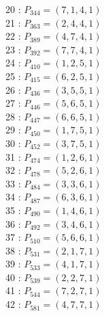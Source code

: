 \documentclass{article}
\begin{document}
{\begin{multicols}{2}
20 : $P_{344}=( 7, 1, 4, 1 )$\\
21 : $P_{363}=( 2, 4, 4, 1 )$\\
22 : $P_{389}=( 4, 7, 4, 1 )$\\
23 : $P_{392}=( 7, 7, 4, 1 )$\\
24 : $P_{410}=( 1, 2, 5, 1 )$\\
25 : $P_{415}=( 6, 2, 5, 1 )$\\
26 : $P_{436}=( 3, 5, 5, 1 )$\\
27 : $P_{446}=( 5, 6, 5, 1 )$\\
28 : $P_{447}=( 6, 6, 5, 1 )$\\
29 : $P_{450}=( 1, 7, 5, 1 )$\\
30 : $P_{452}=( 3, 7, 5, 1 )$\\
31 : $P_{474}=( 1, 2, 6, 1 )$\\
32 : $P_{478}=( 5, 2, 6, 1 )$\\
33 : $P_{484}=( 3, 3, 6, 1 )$\\
34 : $P_{487}=( 6, 3, 6, 1 )$\\
35 : $P_{490}=( 1, 4, 6, 1 )$\\
36 : $P_{492}=( 3, 4, 6, 1 )$\\
37 : $P_{510}=( 5, 6, 6, 1 )$\\
38 : $P_{531}=( 2, 1, 7, 1 )$\\
39 : $P_{533}=( 4, 1, 7, 1 )$\\
40 : $P_{539}=( 2, 2, 7, 1 )$\\
41 : $P_{544}=( 7, 2, 7, 1 )$\\
42 : $P_{581}=( 4, 7, 7, 1 )$\\
\end{multicols}
}
\end{document}
